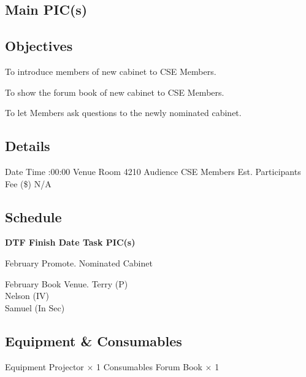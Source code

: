 \startsection[title={CSESS Forum}][
date={\date[d=14, m=2, y=2024][event]},
pic={Terry (P), Nelson (IV), Sam (EV)}]

\subsection{Main PIC(s)}

\subsection{Objectives}
\startitemize
\item To introduce members of new cabinet to CSE Members.
\item To show the forum book of new cabinet to CSE Members.
\item To let Members ask questions to the newly nominated cabinet.
\stopitemize

\subsection{Details}
\starttabulate[|rB|l|]
\NC Date
\NC {} \NR
\NC Time
:00:00 \NR
\NC Venue
\NC Room 4210 \NR
\NC Audience
\NC CSE Members \NR
\NC Est. Participants
 \NR
\NC Fee (\$)
\NC N/A \NR
\stoptabulate

\subsection{Schedule}

\setupTABLE[c][1][width=0.75in]
\setupTABLE[c][2][width=1in]
\setupTABLE[c][3][width=3in]
\setupTABLE[c][4][width=1.25in]
\bTABLE
\bTABLEhead

\bTR\bTH    \bf{DTF}
\eTH\bTH    \bf{Finish Date}
\eTH\bTH    \bf{Task}
\eTH\bTH    \bf{PIC(s)}
\eTH\eTR

\eTABLEhead
\bTABLEbody

\bTR{}
\eTD{} February
\eTD\bTD Promote.
\eTD\bTD Nominated Cabinet
\eTD\eTR

\bTR{}
\eTD{} February
\eTD\bTD Book Venue.
\eTD\bTD Terry (P) \\ Nelson (IV) \\ Samuel (In Sec)
\eTD\eTR

\eTABLEbody
\eTABLE

\subsection{Equipment \& Consumables}
\starttabulate[|l|l|]
\NC{}Equipment\NC\NR
\HL
\NC Projector \NC $\times$ 1 \NR
\HL
\NR
\NC{}Consumables\NC\NR
\HL
\NC Forum Book \NC $\times$ 1 \NR
\HL
\stoptabulate

